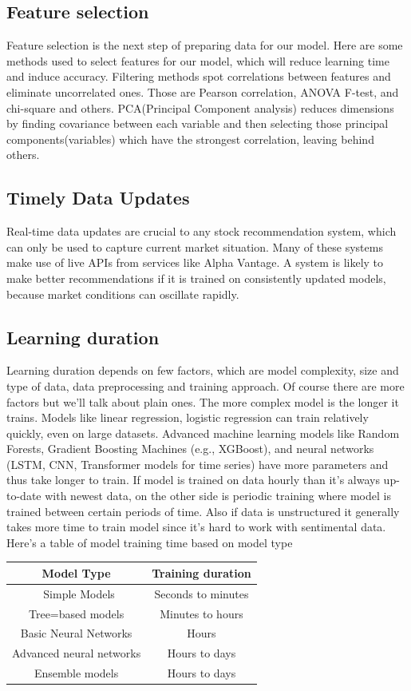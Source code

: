 \documentclass[10pt,twoside,english,a4paper]{article}
\begin{document}
\subsection{Feature selection}
Feature selection is the next step of preparing data for our model. Here are some methods used to select features for our model, which will reduce learning time and induce accuracy.
Filtering methods spot correlations between features and eliminate uncorrelated ones. Those are Pearson correlation, ANOVA F-test, and chi-square and others. PCA(Principal Component analysis) reduces dimensions by finding covariance between each variable and then selecting those principal components(variables) which have the strongest correlation, leaving behind others.
\cite{data_preproc_feature_sel_time_updates}
\subsection{Timely Data Updates}
Real-time data updates are crucial to any stock recommendation system, which can only be used to capture current market situation. Many of these systems make use of live APIs from services like Alpha Vantage. A system is likely to make better recommendations if it is trained on consistently updated models, because market conditions can oscillate rapidly.\cite{up-to-date_data}
\subsection{Learning duration}
Learning duration depends on few factors, which are model complexity, size and type of data, data preprocessing and training approach. Of course there are more factors but we'll talk about plain ones. The more complex model is the longer it trains.  Models like linear regression, logistic regression can train relatively quickly, even on large datasets. Advanced machine learning models like Random Forests, Gradient Boosting Machines (e.g., XGBoost), and neural networks (LSTM, CNN, Transformer models for time series) have more parameters and thus take longer to train. If model is trained on data hourly than it's always up-to-date with newest data, on the other side is periodic training where model is trained between certain periods of time. Also if data is unstructured it generally takes more time to train model since it's hard to work with sentimental data. 
Here's a table of model training time based on model type
\begin{center}
\begin{tabular}{|c | c|} 
 \hline
 Model Type & Training duration\\ [1ex] 
 \hline\
 Simple Models & Seconds to minutes \\ [1ex] 
 \hline
 Tree=based models& Minutes to hours\\ [1ex]
 \hline
 Basic Neural Networks & Hours\\ [1ex]
 \hline
 Advanced neural networks & Hours to days\\ [1ex] 
 \hline
 Ensemble models & Hours to days\\ [1ex]
 \hline
\end{tabular}
\end{center}\cite{train_t}
\end{document}
